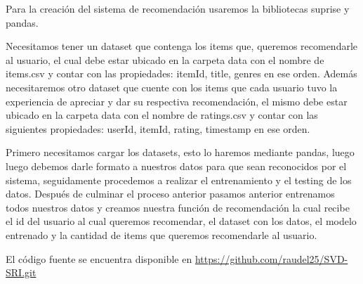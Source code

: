 \documentclass{article}
\begin{document}
Para la creación del sistema de recomendación usaremos la bibliotecas suprise y pandas.

Necesitamos tener un dataset que contenga los items que, queremos recomendarle al usuario, el cual debe estar ubicado en la carpeta data con el nombre de items.csv y contar con las propiedades: itemId, title, genres en ese orden. Además necesitaremos otro dataset que cuente con los items que cada usuario tuvo la experiencia de apreciar y dar su respectiva recomendación, el mismo debe estar ubicado en la carpeta data con el nombre de ratings.csv y contar con las siguientes propiedades:
userId, itemId, rating, timestamp en ese orden.

Primero necesitamos cargar los datasets, esto lo haremos mediante pandas, luego luego debemos darle formato a nuestros datos para que sean reconocidos por el sistema, seguidamente procedemos a realizar el entrenamiento y el testing de los datos. Después de culminar el proceso anterior pasamos anterior entrenamos todos nuestros datos y creamos nuestra función de recomendación la cual recibe el id del usuario al cual queremos recomendar, el dataset con los datos, el modelo entrenado y la cantidad de items que queremos recomendarle al usuario.

El código fuente se encuentra disponible en \url{https://github.com/raudel25/SVD-SRI.git}
\end{document}
